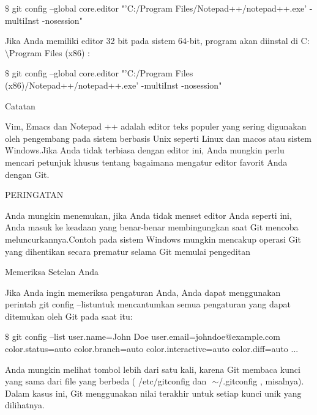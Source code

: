 \vspace{12pt}
\noindent 
  $  \$  $ git config --global core.editor "'C:/Program Files/Notepad++/notepad++.exe' -multiInst -nosession"  \par
\vspace{12pt}
\noindent 
Jika Anda memiliki editor 32 bit pada sistem 64-bit, program akan diinstal di $  $C: $  \setminus  $Program Files (x86) $  $: \par
\vspace{12pt}
\noindent 
  $  \$  $ git config --global core.editor "'C:/Program Files (x86)/Notepad++/notepad++.exe' -multiInst -nosession"  \par
\vspace{12pt}
\noindent 
Catatan \par
\vspace{12pt}
\noindent 
Vim, Emacs dan Notepad ++ adalah editor teks populer yang sering digunakan oleh pengembang pada sistem berbasis Unix seperti Linux dan macos atau sistem Windows.Jika Anda tidak terbiasa dengan editor ini, Anda mungkin perlu mencari petunjuk khusus tentang bagaimana mengatur editor favorit Anda dengan Git. \par
\vspace{12pt}
\noindent 
PERINGATAN \par
\vspace{12pt}
\noindent 
Anda mungkin menemukan, jika Anda tidak menset editor Anda seperti ini, Anda masuk ke keadaan yang benar-benar membingungkan saat Git mencoba meluncurkannya.Contoh pada sistem Windows mungkin mencakup operasi Git yang dihentikan secara prematur selama Git memulai pengeditan \par
\vspace{12pt}
\noindent 
Memeriksa Setelan Anda \par
\vspace{12pt}
\noindent 
Jika Anda ingin memeriksa pengaturan Anda, Anda dapat menggunakan perintah $  $git config --listuntuk mencantumkan semua pengaturan yang dapat ditemukan oleh Git pada saat itu: \par
\vspace{12pt}
\noindent 
  $  \$  $ git config --list user.name=John Doe user.email=johndoe@example.com color.status=auto color.branch=auto color.interactive=auto color.diff=auto ...  \par
\vspace{12pt}
\noindent 
Anda mungkin melihat tombol lebih dari satu kali, karena Git membaca kunci yang sama dari file yang berbeda ( $  $/etc/gitconfig $  $dan $  $ $  \sim  $/.gitconfig $  $, misalnya). $  $Dalam kasus ini, Git menggunakan nilai terakhir untuk setiap kunci unik yang dilihatnya. \par
